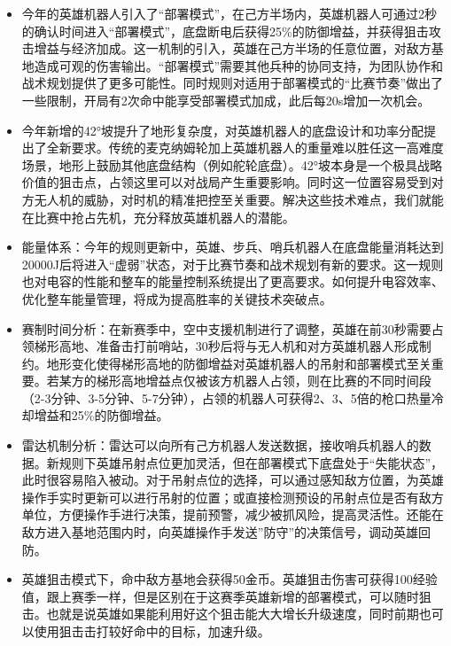             \begin{itemize}
                \item 今年的英雄机器人引入了“部署模式”，在己方半场内，英雄机器人可通过2秒的确认时间进入“部署模式”，底盘断电后获得25\%的防御增益，并获得狙击攻击增益与经济加成。这一机制的引入，英雄在己方半场的任意位置，对敌方基地造成可观的伤害输出。“部署模式”需要其他兵种的协同支持，为团队协作和战术规划提供了更多可能性。同时规则对适用于部署模式的“比赛节奏”做出了一些限制，开局有2次命中能享受部署模式加成，此后每20s增加一次机会。
                
                \item 今年新增的42°坡提升了地形复杂度，对英雄机器人的底盘设计和功率分配提出了全新要求。传统的麦克纳姆轮加上英雄机器人的重量难以胜任这一高难度场景，地形上鼓励其他底盘结构（例如舵轮底盘）。42°坡本身是一个极具战略价值的狙击点，占领这里可以对战局产生重要影响。同时这一位置容易受到对方无人机的威胁，对时机的精准把控至关重要。解决这些技术难点，我们就能在比赛中抢占先机，充分释放英雄机器人的潜能。
                
                \item 能量体系：今年的规则更新中，英雄、步兵、哨兵机器人在底盘能量消耗达到20000J后将进入“虚弱”状态，对于比赛节奏和战术规划有新的要求。这一规则也对电容的性能和整车的能量控制系统提出了更高要求。如何提升电容效率、优化整车能量管理，将成为提高胜率的关键技术突破点。
                
                \item 赛制时间分析：在新赛季中，空中支援机制进行了调整，英雄在前30秒需要占领梯形高地、准备击打前哨站，30秒后将与无人机和对方英雄机器人形成制约。地形变化使得梯形高地的防御增益对英雄机器人的吊射和部署模式至关重要。若某方的梯形高地增益点仅被该方机器人占领，则在比赛的不同时间段（2-3分钟、3-5分钟、5-7分钟），占领的机器人可获得2、3、5倍的枪口热量冷却增益和25\%的防御增益。
                
                \item 雷达机制分析：雷达可以向所有己方机器人发送数据，接收哨兵机器人的数据。新规则下英雄吊射点位更加灵活，但在部署模式下底盘处于“失能状态”，此时很容易陷入被动。对于吊射点位的选择，可以通过感知敌方位置，为英雄操作手实时更新可以进行吊射的位置；或直接检测预设的吊射点位是否有敌方单位，方便操作手进行决策，提前预警，减少被抓风险，提高灵活性。还能在敌方进入基地范围内时，向英雄操作手发送”防守”的决策信号，调动英雄回防。
    
                \item 英雄狙击模式下，命中敌方基地会获得50金币。英雄狙击伤害可获得100经验值，跟上赛季一样，但是区别在于这赛季英雄新增的部署模式，可以随时狙击。也就是说英雄如果能利用好这个狙击能大大增长升级速度，同时前期也可以使用狙击击打较好命中的目标，加速升级。


\end{itemize}
